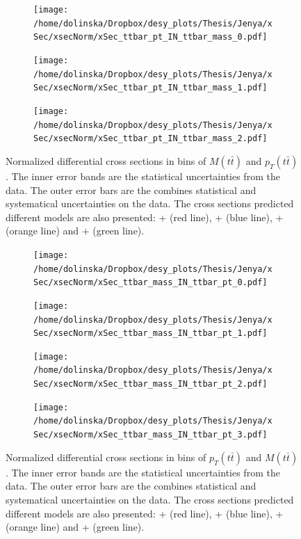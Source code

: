 \begin{figure}[p]
\centering
\begin{subfigure}
  \centering
  \texttt{[image: /home/dolinska/Dropbox/desy\_plots/Thesis/Jenya/xSec/xsecNorm/xSec\_ttbar\_pt\_IN\_ttbar\_mass\_0.pdf]}
\end{subfigure}
\begin{subfigure}
  \centering
  \texttt{[image: /home/dolinska/Dropbox/desy\_plots/Thesis/Jenya/xSec/xsecNorm/xSec\_ttbar\_pt\_IN\_ttbar\_mass\_1.pdf]}
\end{subfigure}
\begin{subfigure}
  \centering
  \texttt{[image: /home/dolinska/Dropbox/desy\_plots/Thesis/Jenya/xSec/xsecNorm/xSec\_ttbar\_pt\_IN\_ttbar\_mass\_2.pdf]}
\end{subfigure}
\caption{Normalized differential cross sections in bins of $M(t\bar{t})$ and $p_{T}(t\bar{t})$. The inner error bands are the statistical uncertainties from the data.
         The outer error bars are the combines statistical and systematical uncertainties on the data. The cross sections predicted different models are also presented:
         \MG + \PYTHIA (red line), \Powheg + \PYTHIA (blue line), \Powheg + \HERWIG (orange line) and \MCNLO + \HERWIG (green line).}
\label{fig:XS_2D_Mtt_pttt}
\end{figure}
\begin{figure}[p]
\centering
\begin{subfigure}
  \centering
  \texttt{[image: /home/dolinska/Dropbox/desy\_plots/Thesis/Jenya/xSec/xsecNorm/xSec\_ttbar\_mass\_IN\_ttbar\_pt\_0.pdf]}
\end{subfigure}
\begin{subfigure}
  \centering
  \texttt{[image: /home/dolinska/Dropbox/desy\_plots/Thesis/Jenya/xSec/xsecNorm/xSec\_ttbar\_mass\_IN\_ttbar\_pt\_1.pdf]}
\end{subfigure}
\begin{subfigure}
  \centering
  \texttt{[image: /home/dolinska/Dropbox/desy\_plots/Thesis/Jenya/xSec/xsecNorm/xSec\_ttbar\_mass\_IN\_ttbar\_pt\_2.pdf]}
\end{subfigure}
\begin{subfigure}
  \centering
  \texttt{[image: /home/dolinska/Dropbox/desy\_plots/Thesis/Jenya/xSec/xsecNorm/xSec\_ttbar\_mass\_IN\_ttbar\_pt\_3.pdf]}
\end{subfigure}
\caption{Normalized differential cross sections in bins of $p_{T}(t\bar{t})$ and $M(t\bar{t})$. The inner error bands are the statistical uncertainties from the data.
         The outer error bars are the combines statistical and systematical uncertainties on the data. The cross sections predicted different models are also presented:
         \MG + \PYTHIA (red line), \Powheg + \PYTHIA (blue line), \Powheg + \HERWIG (orange line) and \MCNLO + \HERWIG (green line).}
\label{fig:XS_2D_Mtt_pttt1}
\end{figure}

